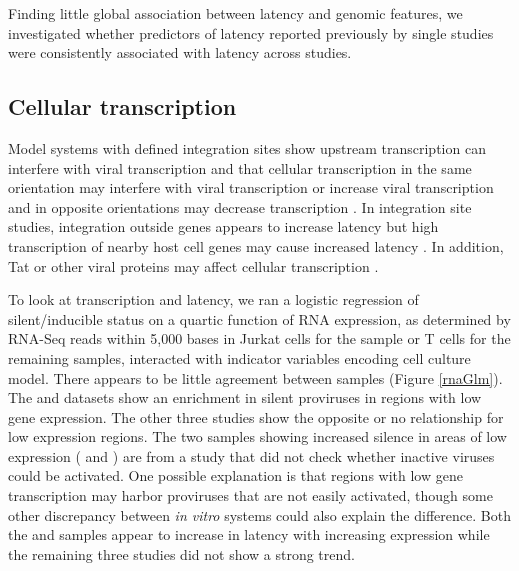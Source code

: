 \documentclass[../sherrill-Mix_thesis.tex]{subfiles}
\begin{document}
		Finding little global association between latency and genomic features, we investigated whether predictors of latency reported previously by single studies were consistently associated with latency across studies.

	\subsection{Cellular transcription}
		Model systems with defined integration sites show upstream transcription can interfere with viral transcription \citep{Greger1998} and that cellular transcription in the same orientation may interfere with viral transcription \citep{Lenasi2008} or increase viral transcription \citep{Han2008} and in opposite orientations may decrease transcription \citep{Han2008}. In integration site studies, integration outside genes appears to increase latency \citep{Lewinski2005} but high transcription of nearby host cell genes may cause increased latency \citep{Lewinski2005,Shan2011}. In addition, Tat or other viral proteins may affect cellular transcription \citep{Marco2008,Chang2011}. %

		To look at transcription and latency, we ran a logistic regression of silent/inducible status on a quartic function of RNA expression, as determined by RNA-Seq reads within 5,000 bases in Jurkat cells for the \Jurkat{} sample or \cdFour{} T cells for the remaining samples, interacted with indicator variables encoding cell culture model. There appears to be little agreement between samples (Figure \ref{rnaGlm}). The \Resting{} and \Active{} datasets show an enrichment in silent proviruses in regions with low gene expression. The other three studies show the opposite or no relationship for low expression regions. The two samples showing increased silence in areas of low expression  (\Resting{} and \Active{}) are from a study that did not check whether inactive viruses could be activated. One possible explanation is that regions with low gene transcription may harbor proviruses that are not easily activated, though some other discrepancy between \textit{in vitro} systems could also explain the difference. Both the \Jurkat{} and \Active{} samples appear to increase in latency with increasing expression while the remaining three studies did not show a strong trend. 
\end{document}

